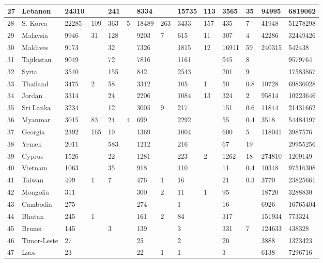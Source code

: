\begin{landscape}
\begin{footnotesize}
\begin{longtable}{ | l | l | l | l | l | l | l | l | l | l | l | l | l | l | }
	27 & Lebanon & 24310 &  & 241 &  & 8334 &  & 15735 & 113 & 3565 & 35 & 94995 & 6819062 \\ \hline
	28 & S. Korea & 22285 & 109 & 363 & 5 & 18489 & 263 & 3433 & 157 & 435 & 7 & 41948 & 51278298 \\ \hline
	29 & Malaysia & 9946 & 31 & 128 &  & 9203 & 7 & 615 & 11 & 307 & 4 & 42286 & 32449426 \\ \hline
	30 & Maldives & 9173 &  & 32 &  & 7326 &  & 1815 & 12 & 16911 & 59 & 240315 & 542438 \\ \hline
	31 & Tajikistan & 9049 &  & 72 &  & 7816 &  & 1161 &  & 945 & 8 &  & 9579764 \\ \hline
	32 & Syria & 3540 &  & 155 &  & 842 &  & 2543 &  & 201 & 9 &  & 17583867 \\ \hline
	33 & Thailand & 3475 & 2 & 58 &  & 3312 &  & 105 & 1 & 50 & 0.8 & 10728 & 69836028 \\ \hline
	34 & Jordan & 3314 &  & 24 &  & 2206 &  & 1084 & 13 & 324 & 2 & 95814 & 10223646 \\ \hline
	35 & Sri Lanka & 3234 &  & 12 &  & 3005 & 9 & 217 &  & 151 & 0.6 & 11844 & 21431662 \\ \hline
	36 & Myanmar & 3015 & 83 & 24 & 4 & 699 &  & 2292 &  & 55 & 0.4 & 3518 & 54484197 \\ \hline
	37 & Georgia & 2392 & 165 & 19 &  & 1369 &  & 1004 &  & 600 & 5 & 118041 & 3987576 \\ \hline
	38 & Yemen & 2011 &  & 583 &  & 1212 &  & 216 &  & 67 & 19 &  & 29955256 \\ \hline
	39 & Cyprus & 1526 &  & 22 &  & 1281 &  & 223 & 2 & 1262 & 18 & 274810 & 1209149 \\ \hline
	40 & Vietnam & 1063 &  & 35 &  & 918 &  & 110 &  & 11 & 0.4 & 10348 & 97516308 \\ \hline
	41 & Taiwan & 499 & 1 & 7 &  & 476 & 1 & 16 &  & 21 & 0.3 & 3770 & 23825661 \\ \hline
	42 & Mongolia & 311 &  &  &  & 300 & 2 & 11 & 1 & 95 &  & 18720 & 3288830 \\ \hline
	43 & Cambodia & 275 &  &  &  & 274 &  & 1 &  & 16 &  & 6926 & 16765404 \\ \hline
	44 & Bhutan & 245 & 1 &  &  & 161 & 2 & 84 &  & 317 &  & 151934 & 773324 \\ \hline
	45 & Brunei & 145 &  & 3 &  & 139 &  & 3 &  & 331 & 7 & 124633 & 438328 \\ \hline
	46 & Timor-Leste & 27 &  &  &  & 25 &  & 2 &  & 20 &  & 3888 & 1323423 \\ \hline
	47 & Laos & 23 &  &  &  & 22 & 1 & 1 &  & 3 &  & 6138 & 7296716 \\ \hline
\end{longtable}
\end{footnotesize}
\end{landscape}

